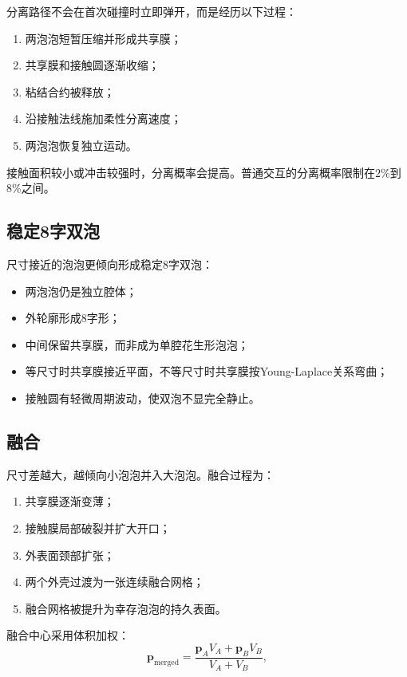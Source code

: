 分离路径不会在首次碰撞时立即弹开，而是经历以下过程：
\begin{enumerate}
  \item 两泡泡短暂压缩并形成共享膜；
  \item 共享膜和接触圆逐渐收缩；
  \item 粘结合约被释放；
  \item 沿接触法线施加柔性分离速度；
  \item 两泡泡恢复独立运动。
\end{enumerate}

接触面积较小或冲击较强时，分离概率会提高。普通交互的分离概率限制在$2\%$到$8\%$之间。

\subsection{稳定8字双泡}

尺寸接近的泡泡更倾向形成稳定8字双泡：
\begin{itemize}
  \item 两泡泡仍是独立腔体；
  \item 外轮廓形成8字形；
  \item 中间保留共享膜，而非成为单腔花生形泡泡；
  \item 等尺寸时共享膜接近平面，不等尺寸时共享膜按Young-Laplace关系弯曲；
  \item 接触圆有轻微周期波动，使双泡不显完全静止。
\end{itemize}


\subsection{融合}

尺寸差越大，越倾向小泡泡并入大泡泡。融合过程为：
\begin{enumerate}
  \item 共享膜逐渐变薄；
  \item 接触膜局部破裂并扩大开口；
  \item 外表面颈部扩张；
  \item 两个外壳过渡为一张连续融合网格；
  \item 融合网格被提升为幸存泡泡的持久表面。
\end{enumerate}

融合中心采用体积加权：
\[
\mathbf{p}_{\mathrm{merged}} = \frac{\mathbf{p}_A V_A + \mathbf{p}_B V_B}{V_A + V_B},
\]

